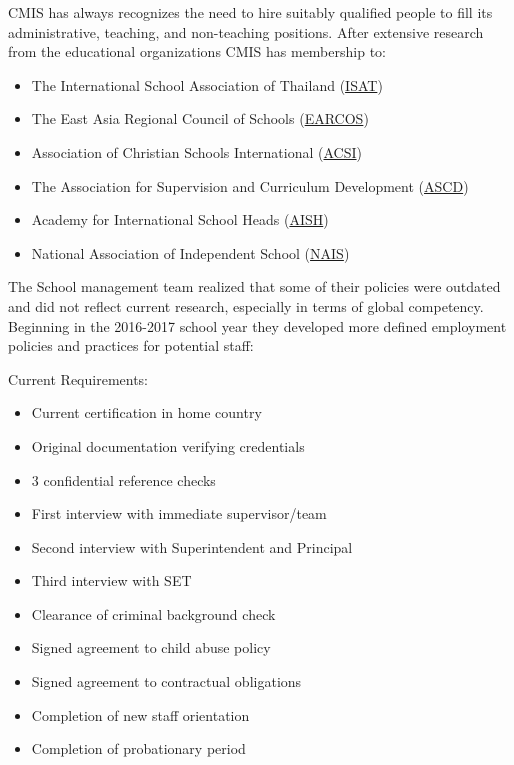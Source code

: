 \begin{findings}
CMIS has always recognizes the need to hire suitably qualified people to fill its administrative, teaching, and non-teaching positions. After extensive research from the educational organizations CMIS has membership to:

\begin{itemize}
\item The International School Association of Thailand (\href{http://gallery.cmis.ac.th/2016-2017/ISAT-Regional-Meeting/}{ISAT})
\item The East Asia Regional Council of Schools (\href{https://www.earcos.org/}{EARCOS})
\item Association of Christian Schools International (\href{https://www.acsi.org/}{ACSI})
\item The Association for Supervision and Curriculum Development (\href{http://www.ascd.org/about-ascd.aspx}{ASCD})
\item Academy for International School Heads (\href{http://aishbank.squarespace.com/}{AISH})
\item National Association of Independent School (\href{http://www.nais.org/Pages/default.aspx}{NAIS}) 
\end{itemize}

The School management team realized that some of their policies were outdated and did not reflect current research, especially in terms of global competency. Beginning in the 2016-2017 school year they developed more defined employment policies and practices for potential staff:

Current Requirements:
\begin{itemize}
\item Current certification in home country
\item Original documentation verifying credentials
\item 3 confidential reference checks
\item First interview with immediate supervisor/team
\item Second interview with Superintendent and Principal
\item Third interview with SET
\item Clearance of criminal background check
\item Signed agreement to child abuse policy
\item Signed agreement to contractual obligations
\item Completion of new staff orientation
\item Completion of probationary period
\end{itemize}


\end{findings}
